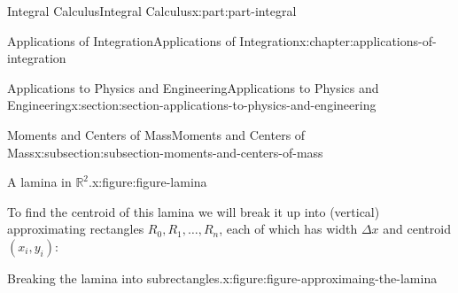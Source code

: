 \documentclass[twoside,10pt,]{book}
\numberwithin{equation}{part}
\begin{document}
\begin{partptx}{Integral Calculus}{}{Integral Calculus}{}{}{x:part:part-integral}
\begin{chapterptx}{Applications of Integration}{}{Applications of Integration}{}{}{x:chapter:applications-of-integration}
\begin{sectionptx}{Applications to Physics and Engineering}{}{Applications to Physics and Engineering}{}{}{x:section:section-applications-to-physics-and-engineering}
\begin{subsectionptx}{Moments and Centers of Mass}{}{Moments and Centers of Mass}{}{}{x:subsection:subsection-moments-and-centers-of-mass}
\begin{figureptx}{A lamina in \(\mathbb{R}^{2}\).}{x:figure:figure-lamina}{}
\begin{image}{0}{1}{0}
{
}%
\end{image}%
\tcblower
\end{figureptx}%
To find the centroid of this lamina we will break it up into (vertical) approximating rectangles \(R_{0},R_{1},\ldots,R_{n}\), each of which has width \(\Delta x\) and centroid \((x_{i},y_{i})\):%
\begin{figureptx}{Breaking the lamina into subrectangles.}{x:figure:figure-approximaing-the-lamina}{}%
\begin{image}{0}{1}{0}%
\end{image}
\end{figureptx}
\end{subsectionptx}
\end{sectionptx}
\end{chapterptx}
\end{partptx}
\end{document}
